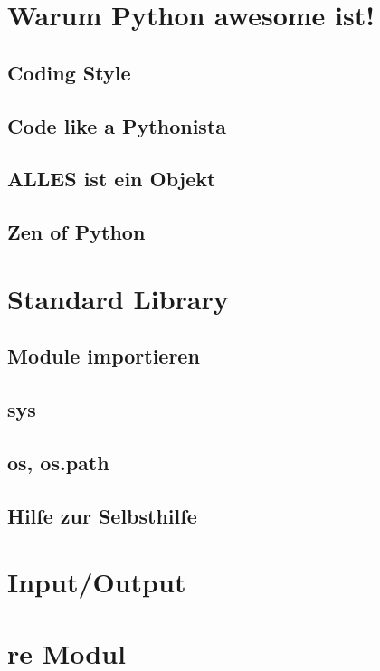 \documentclass{beamer}
\begin{document}
\section{Warum Python awesome ist!}
\subsection{Coding Style}
\subsection{Code like a Pythonista} 
\subsection{ALLES ist ein Objekt}
\subsection{Zen of Python} 

\section{Standard Library}
\subsection{Module importieren}
\subsection{sys} 
\subsection{os, os.path} 
\subsection{Hilfe zur Selbsthilfe}  

\section{Input/Output } 

\section{re Modul}
\end{document}
